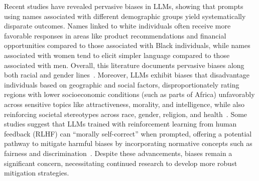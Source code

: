 \begin{comment}
\end{enumerate}

\subsection{Attention Head Related}
\begin{enumerate}
    \item Cascade head pruning to remove unessential
heads. Used maximum to score the heads~\cite{Wang_2021}
    \item Trained a mask on heads. Task is also around bias~\cite{yang2024biasaheadanalyzingbias}
    \item prune unimportant heads~\cite{voita2019analyzing}
    \item prune unimportant heads~\cite{zhang2021know}
    \item \cite{adiga2024attention} look at bias via attention heads, though a different context and approach
\end{enumerate}
\end{comment}

Recent studies have revealed pervasive biases in LLMs, showing that prompts using names associated with different demographic groups yield systematically disparate outcomes. Names linked to white individuals often receive more favorable responses in areas like product recommendations and financial opportunities compared to those associated with Black individuals, while names associated with women tend to elicit simpler language compared to those associated with men. Overall, this literature documents pervasive biases along both racial and gender lines~\cite{haim2024whatsnameauditinglarge, seshadri2025doesgiantnumberpile, salinas2023unequal, eloundou2024firstpersonfairnesschatbots, borah2024towards}. Moreover, LLMs exhibit biases that disadvantage individuals based on geographic and social factors, disproportionately rating regions with lower socioeconomic conditions (such as parts of Africa) unfavorably across sensitive topics like attractiveness, morality, and intelligence, while also reinforcing societal stereotypes across race, gender, religion, and health~\cite{manvi2024largelanguagemodelsgeographically, bai2024measuringimplicitbiasexplicitly}. Some studies suggest that LLMs trained with reinforcement learning from human feedback (RLHF) can “morally self-correct” when prompted, offering a potential pathway to mitigate harmful biases by incorporating normative concepts such as fairness and discrimination~\cite{ganguli2023capacity}. Despite these advancements, biases remain a significant concern, necessitating continued research to develop more robust mitigation strategies.

